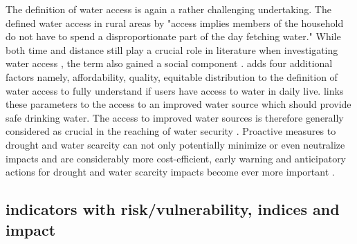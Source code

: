 {The definition of water access is again a rather challenging undertaking. The \autocite[254]{worldbankWorldDevelopmentReport1997} defined water access in rural areas by "access implies members of the household do not have to spend a disproportionate part of the day fetching water." While both time and distance still play a crucial role in literature when investigating water access \autocite{cassiviDrinkingWaterAccessibility2019,cassiviEvaluatingSelfreportedMeasures2021,emenikeAccessingSafeDrinking2017}, the term also gained a social component \autocite{emenikeAccessingSafeDrinking2017,mitlinUnaffordableUndrinkable}. \autocite{obeng-odoomAccessWater2012} adds four additional factors namely, affordability, quality, equitable distribution to the definition of water access to fully understand if users have access to water in daily live. \autocite{unitednations/developmentprogrammeDeepeningDemocracyFragmented2002} links these parameters to the access to an improved water source which should provide safe drinking water.
The access to improved water sources is therefore generally considered as crucial in the reaching of water security \autocite{cdcAssessingAccessWater2022}. Proactive measures to drought and water scarcity can not only potentially minimize or even neutralize impacts and are considerably more cost-efficient, early warning and anticipatory actions for drought and water scarcity impacts become ever more important \autocite{faoandun-waterProgressLevelWater2021,idmpDroughtWaterScarcity2022,worldbankHighDryClimate2016}.


\subsection{indicators with risk/vulnerability, indices and impact}\label{subsec:indicators} %

}
